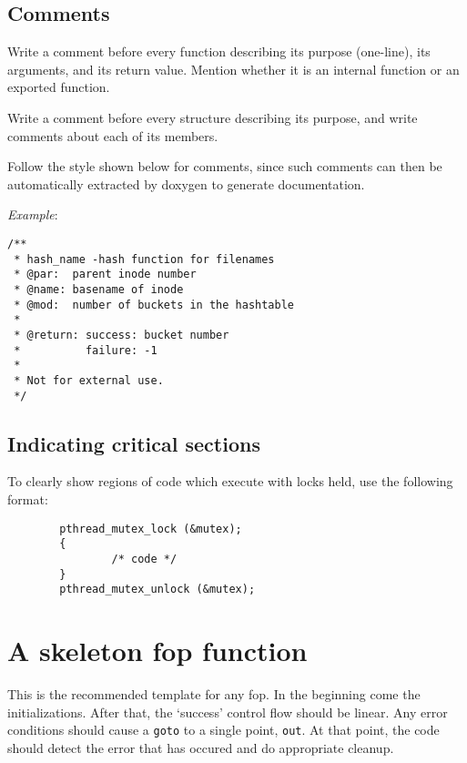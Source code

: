 \documentclass{article}[12pt]
\begin{document}
\subsection*{Comments}
Write a comment before every function describing its purpose (one-line),
its arguments, and its return value. Mention whether it is an internal
function or an exported function.

Write a comment before every structure describing its purpose, and
write comments about each of its members.

Follow the style shown below for comments, since such comments
can then be automatically extracted by doxygen to generate
documentation.

\textsl{Example}:
\begin{verbatim}
/**
 * hash_name -hash function for filenames
 * @par:  parent inode number
 * @name: basename of inode
 * @mod:  number of buckets in the hashtable
 *
 * @return: success: bucket number
 *          failure: -1
 *
 * Not for external use.
 */
\end{verbatim}

\subsection*{Indicating critical sections}
To clearly show regions of code which execute with locks held, use
the following format:

\begin{verbatim}
        pthread_mutex_lock (&mutex);
        {
                /* code */
        }
        pthread_mutex_unlock (&mutex);
\end{verbatim}

\section*{A skeleton fop function}
This is the recommended template for any fop. In the beginning come
the initializations. After that, the `success' control flow should be
linear.  Any error conditions should cause a \texttt{goto} to a single
point, \texttt{out}.  At that point, the code should detect the error
that has occured and do appropriate cleanup.
\end{document}
